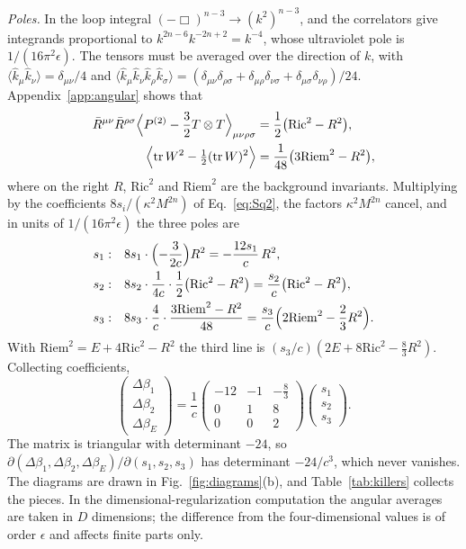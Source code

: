 \documentclass[aps,prd,10pt,twocolumn,superscriptaddress,nofootinbib,floatfix,longbibliography]{revtex4-2}
\newcommand{\Pt}{P^{(2)}}
\newcommand{\Ric}{\mathrm{Ric}}
\newcommand{\Riem}{\mathrm{Riem}}
\begin{document}
\textit{Poles.} In the loop integral $(-\Box)^{n-3}\to(k^2)^{n-3}$, and the correlators give integrands proportional to $k^{2n-6}k^{-2n+2}=k^{-4}$, whose ultraviolet pole is $1/(16\pi^2\epsilon)$. The tensors must be averaged over the direction of $k$, with $\langle\hat k_\mu\hat k_\nu\rangle=\delta_{\mu\nu}/4$ and $\langle\hat k_\mu\hat k_\nu\hat k_\rho\hat k_\sigma\rangle=(\delta_{\mu\nu}\delta_{\rho\sigma}+\delta_{\mu\rho}\delta_{\nu\sigma}+\delta_{\mu\sigma}\delta_{\nu\rho})/24$. Appendix~\ref{app:angular} shows that
\begin{align}
\bar R^{\mu\nu}\bar R^{\rho\sigma}\Bigl\langle\Pt-\frac32T\otimes T\Bigr\rangle_{\mu\nu\rho\sigma}&=\frac12\bigl(\Ric^2-R^2\bigr),\label{eq:angular}\\
\Bigl\langle\operatorname{tr}W^2-\tfrac12(\operatorname{tr}W)^2\Bigr\rangle&=\frac1{48}\bigl(3\Riem^2-R^2\bigr),\label{eq:angularRiem}
\end{align}
where on the right $R$, $\Ric^2$ and $\Riem^2$ are the background invariants. Multiplying by the coefficients $8s_i/(\kappa^2M^{2n})$ of Eq.~\eqref{eq:Sq2}, the factors $\kappa^2M^{2n}$ cancel, and in units of $1/(16\pi^2\epsilon)$ the three poles are
\begin{align*}
s_1:&\quad 8s_1\cdot\Bigl(-\frac3{2c}\Bigr)R^2=-\frac{12s_1}c\,R^2,\\
s_2:&\quad 8s_2\cdot\frac1{4c}\cdot\frac12\bigl(\Ric^2-R^2\bigr)=\frac{s_2}c\bigl(\Ric^2-R^2\bigr),\\
s_3:&\quad 8s_3\cdot\frac4c\cdot\frac{3\Riem^2-R^2}{48}=\frac{s_3}c\Bigl(2\Riem^2-\frac23R^2\Bigr).
\end{align*}
With $\Riem^2=E+4\Ric^2-R^2$ the third line is $(s_3/c)(2E+8\Ric^2-\frac83R^2)$. Collecting coefficients,
\begin{equation}
\label{eq:killcontrib}
\begin{pmatrix}\Delta\beta_1\\ \Delta\beta_2\\ \Delta\beta_E\end{pmatrix}=\frac1c
\begin{pmatrix}-12&-1&-\frac83\\ 0&1&8\\ 0&0&2\end{pmatrix}
\begin{pmatrix}s_1\\ s_2\\ s_3\end{pmatrix}.
\end{equation}
The matrix is triangular with determinant $-24$, so $\partial(\Delta\beta_1,\Delta\beta_2,\Delta\beta_E)/\partial(s_1,s_2,s_3)$ has determinant $-24/c^3$, which never vanishes. The diagrams are drawn in Fig.~\ref{fig:diagrams}(b), and Table~\ref{tab:killers} collects the pieces. In the dimensional-regularization computation the angular averages are taken in $D$ dimensions; the difference from the four-dimensional values is of order $\epsilon$ and affects finite parts only.
\end{document}
